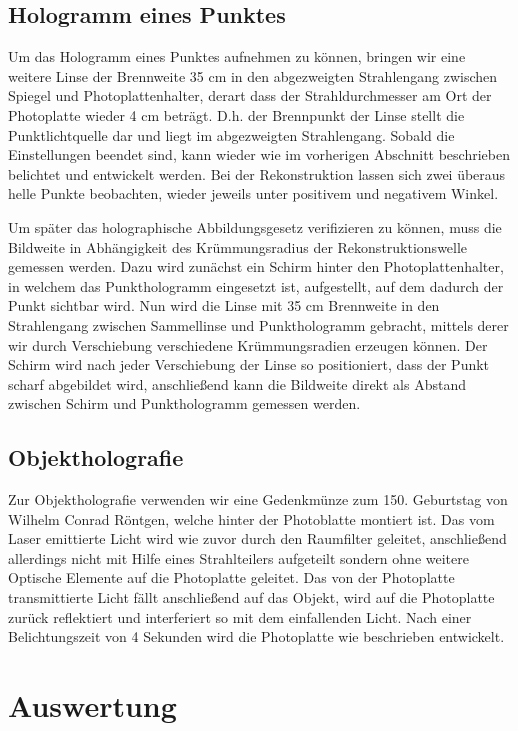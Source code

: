 \documentclass[bigchapter,colorback,accentcolor=tud4b,linedtoc,11pt]{tudreport}
\begin{document}
\section{Hologramm eines Punktes}

Um das Hologramm eines Punktes aufnehmen zu können, bringen wir eine weitere Linse der Brennweite 35 cm in den abgezweigten Strahlengang zwischen Spiegel und Photoplattenhalter, derart dass der Strahldurchmesser am Ort der Photoplatte wieder 4 cm beträgt. D.h. der Brennpunkt der Linse stellt die Punktlichtquelle dar und liegt im abgezweigten Strahlengang. Sobald die Einstellungen beendet sind, kann wieder wie im vorherigen Abschnitt beschrieben belichtet und entwickelt werden. Bei der Rekonstruktion lassen sich zwei überaus helle Punkte beobachten, wieder jeweils unter positivem und negativem Winkel.

Um später das holographische Abbildungsgesetz verifizieren zu können, muss die Bildweite in Abhängigkeit des Krümmungsradius der Rekonstruktionswelle gemessen werden. Dazu wird zunächst ein Schirm hinter den Photoplattenhalter, in welchem das Punkthologramm eingesetzt ist, aufgestellt, auf dem dadurch der Punkt sichtbar wird. Nun wird die Linse mit 35 cm Brennweite in den Strahlengang zwischen Sammellinse und Punkthologramm gebracht, mittels derer wir durch Verschiebung verschiedene Krümmungsradien erzeugen können. Der Schirm wird nach jeder Verschiebung der Linse so positioniert, dass der Punkt scharf abgebildet wird, anschließend kann die Bildweite direkt als Abstand zwischen Schirm und Punkthologramm gemessen werden.

\section{Objektholografie}

Zur Objektholografie verwenden wir eine Gedenkmünze zum 150. Geburtstag von
Wilhelm Conrad Röntgen, welche hinter der Photoblatte montiert ist.  Das vom
Laser emittierte Licht wird wie zuvor durch den Raumfilter geleitet,
anschließend allerdings nicht mit Hilfe eines Strahlteilers aufgeteilt sondern
ohne weitere Optische Elemente auf die Photoplatte geleitet. Das von der
Photoplatte transmittierte Licht fällt anschließend auf das Objekt, wird auf die
Photoplatte zurück reflektiert und interferiert so mit dem einfallenden Licht.
Nach einer Belichtungszeit von 4 Sekunden wird die Photoplatte wie beschrieben
entwickelt.

\chapter{Auswertung}
\end{document}
